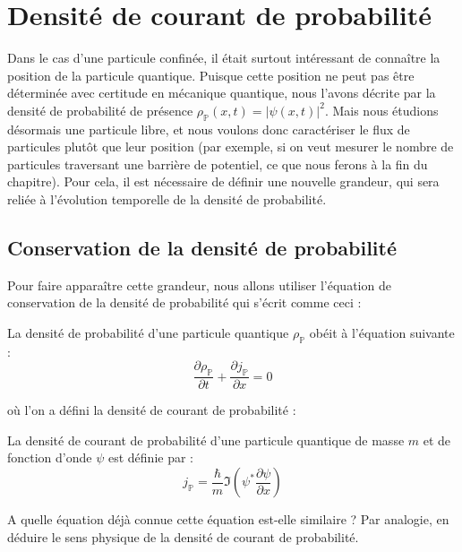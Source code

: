 \documentclass[11pt,fleqn]{book} %
\begin{document}
\section{Densité de courant de probabilité}

Dans le cas d'une particule confinée, il était surtout intéressant de connaître la position de la particule quantique. Puisque cette position ne peut pas être déterminée avec certitude en mécanique quantique, nous l'avons décrite par la densité de probabilité de présence $\rho_{\mathbb{P}}(x,t) = |\psi(x,t)|^2$. Mais nous étudions désormais une particule libre, et nous voulons donc caractériser le flux de particules plutôt que leur position (par exemple, si on veut mesurer le nombre de particules traversant une barrière de potentiel, ce que nous ferons à la fin du chapitre). Pour cela, il est nécessaire de définir une nouvelle grandeur, qui sera reliée à l'évolution temporelle de la densité de probabilité.

\subsection{Conservation de la densité de probabilité}

Pour faire apparaître cette grandeur, nous allons utiliser l'équation de conservation de la densité de probabilité qui s'écrit comme ceci :
\begin{theorem}
	La densité de probabilité d'une particule quantique $\rho_{\mathbb{P}}$ obéit à l'équation suivante :
	\begin{equation}
		\frac{\partial \rho_{\mathbb{P}}}{\partial t} + \frac{\partial j_{\mathbb{P}}}{\partial x} = 0
	\end{equation}
\end{theorem}
où l'on a défini la densité de courant de probabilité :
\begin{definition}
	La densité de courant de probabilité d'une particule quantique de masse $m$ et de fonction d'onde $\psi$ est définie par :
	\begin{equation}
		j_{\mathbb{P}} = \frac{\hbar}{m} \Im \left( \psi^\ast \frac{\partial \psi}{\partial x} \right)
	\end{equation}
\end{definition}

\begin{capex}
	A quelle équation déjà connue cette équation est-elle similaire ? Par analogie, en déduire le sens physique de la densité de courant de probabilité.
\end{capex}
\end{document}
